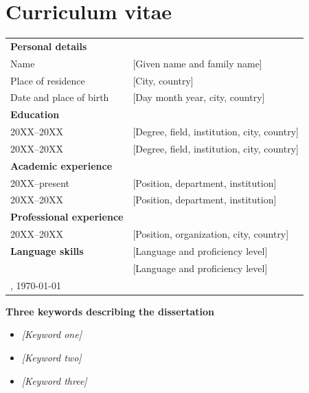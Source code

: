 \pagestyle{empty}
\chapter{Curriculum vitae}
\thispagestyle{empty}
\label{cha:curriculum_vitae}

\begin{tabular}{@{}ll@{}}
	\textbf{Personal details}        &                                             \\
	Name                             & [Given name and family name]                \\
	Place of residence               & [City, country]                             \\
	Date and place of birth          & [Day month year, city, country]             \\[2ex]
	\textbf{Education}               &                                             \\
	20XX--20XX                       & [Degree, field, institution, city, country] \\
	20XX--20XX                       & [Degree, field, institution, city, country] \\[2ex]
	\textbf{Academic experience}     &                                             \\
	20XX--present                    & [Position, department, institution]         \\
	20XX--20XX                       & [Position, department, institution]         \\[2ex]
	\textbf{Professional experience} &                                             \\
	20XX--20XX                       & [Position, organization, city, country]     \\[2ex]
	\textbf{Language skills}         & [Language and proficiency level]            \\
	                                 & [Language and proficiency level]            \\[2ex]
	[City], \today                   &                                             \\[10ex]
\end{tabular}

\textbf{Three keywords describing the dissertation}
\begin{itemize}
	\item \textit{[Keyword one]}
	\item \textit{[Keyword two]}
	\item \textit{[Keyword three]}
\end{itemize}
